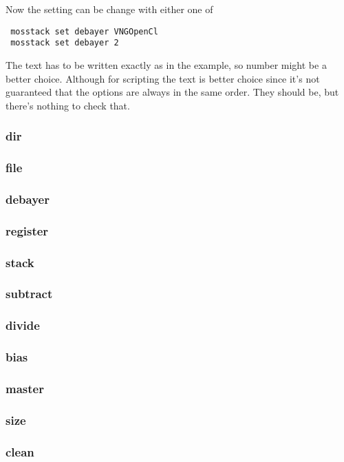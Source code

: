 \documentclass[twoside,a4paper]{refart}
\begin{document}
Now the setting can be change with either one of

\begin{verbatim}
 mosstack set debayer VNGOpenCl
 mosstack set debayer 2
\end{verbatim}

The text has to be written exactly as in the example, so number might be a better choice. Although for scripting the
text is better choice since it's not guaranteed that the options are always in the same order. They should be, but
there's nothing to check that.

\subsubsection{dir}
\subsubsection{file}
\subsubsection{debayer}
\label{debayering}
\subsubsection{register}
\label{registering}
\subsubsection{stack}
\label{stacking}
\subsubsection{subtract}
\subsubsection{divide}
\subsubsection{bias}
\subsubsection{master}
\subsubsection{size}
\subsubsection{clean}
\label{clean}
\end{document}
